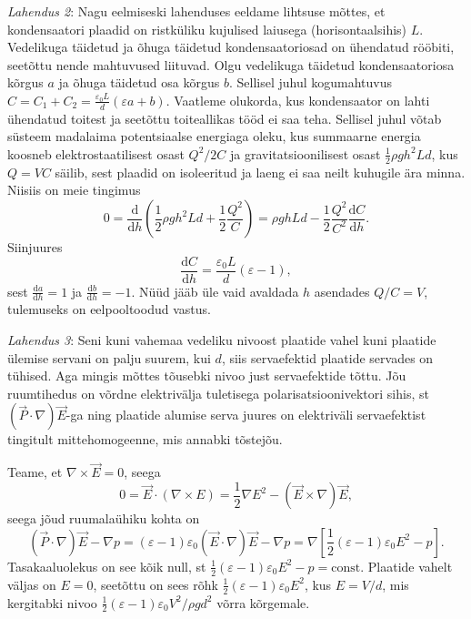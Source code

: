 \documentclass[11pt,a5paper]{article}
\begin{document}
\textit{Lahendus 2}: Nagu eelmiseski lahenduses eeldame lihtsuse mõttes, et kondensaatori plaadid on ristküliku kujulised laiusega (horisontaalsihis) $L$. Vedelikuga täidetud ja õhuga täidetud kondensaatoriosad on ühendatud rööbiti, seetõttu nende mahtuvused liituvad. Olgu vedelikuga täidetud kondensaatoriosa kõrgus $a$ ja õhuga täidetud osa kõrgus $b$. Sellisel juhul  kogumahtuvus $C=C_1+C_2= \frac{\varepsilon_0 L}{d}(\varepsilon a+b)$. Vaatleme olukorda, kus kondensaator on lahti ühendatud toitest ja seetõttu toiteallikas tööd ei saa teha. Sellisel juhul võtab süsteem madalaima potentsiaalse energiaga oleku, kus summaarne energia koosneb elektrostaatilisest osast $Q^2/2C$ ja gravitatsioonilisest osast $\frac 12\rho g h^2Ld$, kus $Q=VC$ säilib, sest plaadid on isoleeritud ja laeng ei saa neilt kuhugile ära minna. Niisiis on meie tingimus
$$0=\frac {\mathrm d}{\mathrm d h}\left( \frac 12\rho g h^2Ld+\frac 12\frac{Q^2}C\right)= \rho g hLd-\frac 12\frac{Q^2}{C^{2}} \frac{\mathrm dC}{\mathrm dh}.$$
Siinjuures
$$ \frac{\mathrm dC}{\mathrm dh}=\frac{\varepsilon_0 L}{d}(\varepsilon -1),$$
sest $\frac{\mathrm da}{\mathrm dh}=1$ ja $\frac{\mathrm db}{\mathrm dh}=-1$. Nüüd jääb üle vaid avaldada $h$ asendades $Q/C=V$, tulemuseks on eelpooltoodud vastus.

\textit{Lahendus 3}:
Seni kuni vahemaa vedeliku nivoost plaatide vahel kuni plaatide ülemise servani on palju suurem, kui $d$, siis servaefektid plaatide servades on tühised. Aga mingis mõttes tõusebki nivoo just servaefektide tõttu. Jõu ruumtihedus on võrdne elektrivälja tuletisega polarisatsioonivektori sihis, st $(\vec P\cdot\nabla)\vec E$-ga ning plaatide alumise serva juures on elektriväli servaefektist tingitult mittehomogeenne, mis annabki tõstejõu.

Teame, et $\nabla \times\vec E=0$, seega
\[
  0=\vec E\cdot(\nabla \times E)=\frac 12 \nabla E^2-(\vec E\times\nabla)\vec E,
\]
seega jõud ruumalaühiku kohta on
\[(\vec P \cdot \nabla)\vec E-\nabla p=(\varepsilon-1)\varepsilon_0(\vec E \cdot \nabla)\vec E-\nabla p=\nabla \left[\frac 12(\varepsilon-1)\varepsilon_0E^2-p \right].
\] Tasakaaluolekus on see kõik null, st $\frac 12(\varepsilon-1)\varepsilon_0E^2-p=\text{const}$. Plaatide vahelt väljas on $E=0$, seetõttu on sees rõhk  $\frac 12(\varepsilon-1)\varepsilon_0E^2$, kus $E=V/d$, mis kergitabki nivoo  $\frac 12(\varepsilon-1)\varepsilon_0V^2/\rho gd^2$ võrra kõrgemale.
\end{document}
